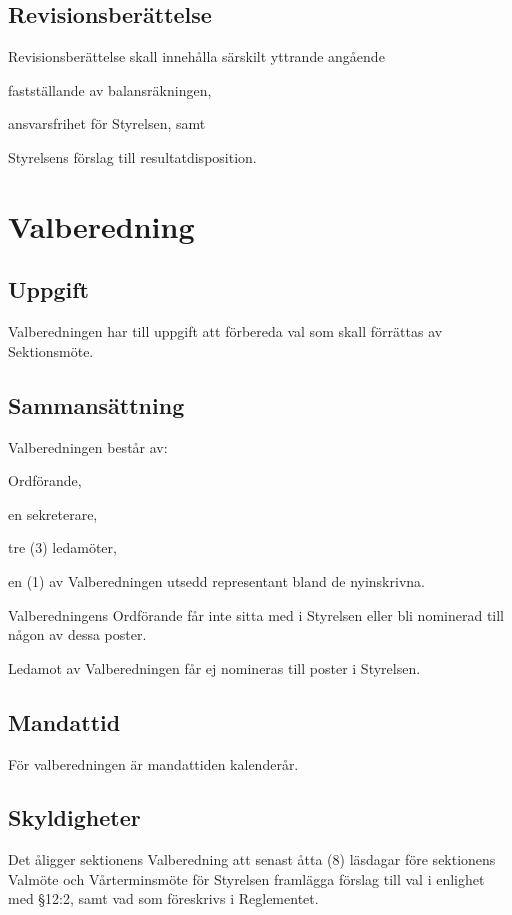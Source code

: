 \documentclass[10pt]{article}
\begin{document}
    \subsection{Revisionsberättelse}
    Revisionsberättelse skall innehålla särskilt yttrande angående
    \begin{alphlist}
    \item fastställande av balansräkningen,
    \item ansvarsfrihet för Styrelsen, samt
    \item Styrelsens förslag till resultatdisposition.
    \end{alphlist}
    \newpage
    
    \section{Valberedning}
    \subsection{Uppgift}
    Valberedningen har till uppgift att förbereda val som skall förrättas av
    Sektionsmöte.
    
    \subsection{Sammansättning}
    Valberedningen består av:
    \begin{alphlist}
    \item Ordförande,
    \item en sekreterare,
    \item tre (3) ledamöter,
    \item en (1) av Valberedningen utsedd representant bland de nyinskrivna.
    \end{alphlist}
    
    Valberedningens Ordförande får inte sitta med i Styrelsen eller bli nominerad till någon av dessa poster.
    
    Ledamot av Valberedningen får ej nomineras till poster i Styrelsen.
    
    \subsection{Mandattid}
    För valberedningen är mandattiden kalenderår.
    
    \subsection{Skyldigheter}
    Det åligger sektionens Valberedning att senast åtta (8) läsdagar före
    sektionens Valmöte och Vårterminsmöte för Styrelsen framlägga förslag till
    val i enlighet med §12:2, samt vad som föreskrivs i Reglementet.
    
\end{document}

